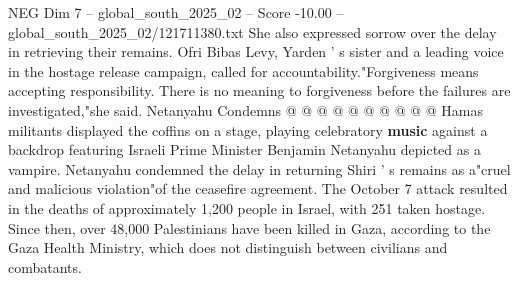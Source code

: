 \begin{textsample}{NEG Dim 7 – global\_south\_2025\_02 – Score -10.00 – global\_south\_2025\_02/121711380.txt}
She also expressed sorrow over the delay in retrieving their remains.
Ofri Bibas Levy, Yarden ' s sister and a leading voice in the hostage release campaign, called for accountability."Forgiveness means accepting responsibility.
There is no meaning to forgiveness before the failures are investigated,"she said.
Netanyahu Condemns @ @ @ @ @ @ @ @ @ @ Hamas militants displayed the coffins on a stage, playing celebratory \textbf{music} against a backdrop featuring Israeli Prime Minister Benjamin Netanyahu depicted as a vampire.
Netanyahu condemned the delay in returning Shiri ' s remains as a"cruel and malicious violation"of the ceasefire agreement.
The October 7 attack resulted in the deaths of approximately 1,200 people in Israel, with 251 taken hostage.
Since then, over 48,000 Palestinians have been killed in Gaza, according to the Gaza Health Ministry, which does not distinguish between civilians and combatants.

\end{textsample}
